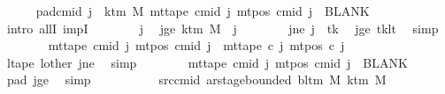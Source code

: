 \begin{isabellebody}
\ \ \ \ \isamarkupfalse%
\ pad{\isacharunderscore}{\kern0pt}cmid{\isacharcolon}{\kern0pt}\ {\isachardoublequoteopen}{\isasymforall}j\ {\isasymge}\ k{\isacharunderscore}{\kern0pt}tm\ M{\isachardot}{\kern0pt}\ mt{\isacharunderscore}{\kern0pt}tape\ cmid\ j\ {\isacharparenleft}{\kern0pt}mt{\isacharunderscore}{\kern0pt}pos\ cmid\ j{\isacharparenright}{\kern0pt}\ {\isacharequal}{\kern0pt}\ BLANK{}{\isachardoublequoteclose}\isanewline
\ \ \ \ \isamarkupfalse%
\ {\isacharparenleft}{\kern0pt}intro\ allI\ impI{\isacharparenright}{\kern0pt}\isanewline
\ \ \ \ \ \ \isamarkupfalse%
\ j\ \isamarkupfalse%
\ jge{\isacharcolon}{\kern0pt}\ {\isachardoublequoteopen}k{\isacharunderscore}{\kern0pt}tm\ M\ {\isasymle}\ j{\isachardoublequoteclose}\isanewline
\ \ \ \ \ \ \isamarkupfalse%
\ jne{\isacharcolon}{\kern0pt}\ {\isachardoublequoteopen}j\ {\isasymnoteq}\ tk{\isachardoublequoteclose}\ \isamarkupfalse%
\ jge\ tk{\isacharunderscore}{\kern0pt}lt\ \isamarkupfalse%
\ simp\isanewline
\ \ \ \ \ \ \isamarkupfalse%
\ {\isachardoublequoteopen}mt{\isacharunderscore}{\kern0pt}tape\ cmid\ j\ {\isacharparenleft}{\kern0pt}mt{\isacharunderscore}{\kern0pt}pos\ cmid\ j{\isacharparenright}{\kern0pt}\ {\isacharequal}{\kern0pt}\ mt{\isacharunderscore}{\kern0pt}tape\ c{}\ j\ {\isacharparenleft}{\kern0pt}mt{\isacharunderscore}{\kern0pt}pos\ c{}\ j{\isacharparenright}{\kern0pt}{\isachardoublequoteclose}\isanewline
\ \ \ \ \ \ \ \ \isamarkupfalse%
\ ltape\ lother\ jne\ \isamarkupfalse%
\ simp\isanewline
\ \ \ \ \ \ \isamarkupfalse%
\ {\isachardoublequoteopen}mt{\isacharunderscore}{\kern0pt}tape\ cmid\ j\ {\isacharparenleft}{\kern0pt}mt{\isacharunderscore}{\kern0pt}pos\ cmid\ j{\isacharparenright}{\kern0pt}\ {\isacharequal}{\kern0pt}\ BLANK{}{\isachardoublequoteclose}\ \isamarkupfalse%
\ pad{}\ jge\ \isamarkupfalse%
\ simp\isanewline
\ \ \ \ \isamarkupfalse%
\isanewline
\ \ \ \ \isamarkupfalse%
\ src{\isacharunderscore}{\kern0pt}cmid{\isacharcolon}{\kern0pt}\ {\isachardoublequoteopen}ar{\isacharunderscore}{\kern0pt}stage{\isacharunderscore}{\kern0pt}bounded\ {\isacharparenleft}{\kern0pt}bl{\isacharunderscore}{\kern0pt}tm\ M{\isacharparenright}{\kern0pt}\ {\isacharparenleft}{\kern0pt}k{\isacharunderscore}{\kern0pt}tm\ M{\isacharparenright}{\kern0pt}\isanewline

\end{isabellebody}
